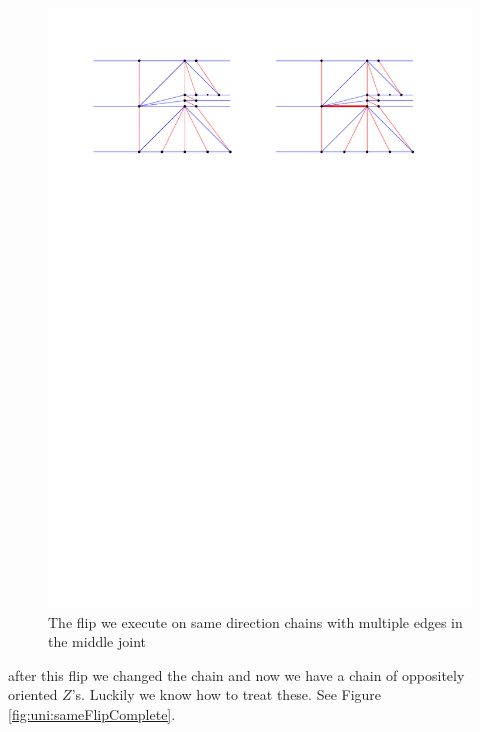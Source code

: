   \begin{figure}[h]
    \centering
    \includegraphics[width =\textwidth]{unifiedAlgo/img/post/sameMultiFlip}
    \caption{The flip we execute on same direction chains with multiple edges in the middle joint}
    \label{fig:uni:sameMultiFlip}
  \end{figure}

   after this flip we changed the chain and now we have a chain of oppositely oriented $Z$'s. Luckily we know how to treat these. See Figure \ref{fig:uni:sameFlipComplete}.

